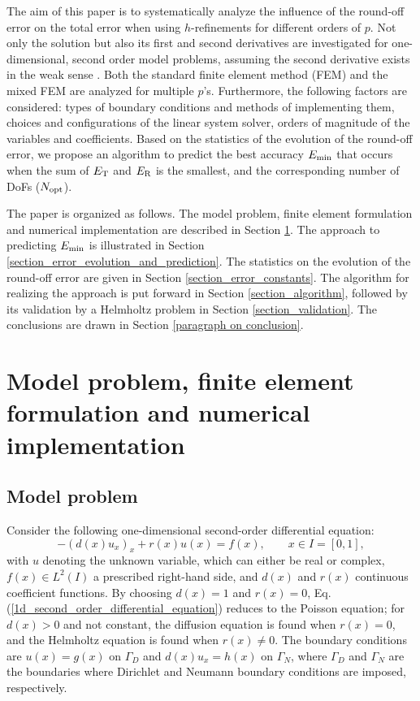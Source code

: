 \documentclass[review,3p]{elsarticle}
\begin{document}
The aim of this paper is to systematically analyze the influence of the round-off error on the total error when using $h$-refinements for different orders of $p$. Not only the solution but also its first and second derivatives are investigated for one-dimensional, second order model problems, assuming the second derivative exists in the weak sense \cite{necas2011direct}. Both the standard finite element method (FEM) and the mixed FEM \cite{boffi2013mixed} are analyzed for multiple $p$'s. Furthermore, the following factors are considered: types of boundary conditions and methods of implementing them, choices and configurations of the linear system solver, orders of magnitude of the variables and coefficients. Based on the statistics of the evolution of the round-off error, we propose an algorithm to predict the best accuracy $E_{\rm min}$ that occurs when the sum of $E_{\rm T}$ and $E_{\rm R}$ is the smallest, and the corresponding number of DoFs ($N_{\rm opt}$).

The paper is organized as follows. The model problem, finite element formulation and numerical implementation are described in Section \ref{section_model_problem_FEM_formulation_numerical_implementation}. The approach to predicting ${E}_{\rm {min}}$ is illustrated in Section \ref{section_error_evolution_and_prediction}. The statistics on the evolution of the round-off error are given in Section \ref{section_error_constants}. The algorithm for realizing the approach is put forward in Section \ref{section_algorithm}, followed by its validation by a Helmholtz problem in Section \ref{section_validation}. The conclusions are drawn in Section \ref{paragraph on conclusion}.


\section{Model problem, finite element formulation and numerical implementation}	\label{section_model_problem_FEM_formulation_numerical_implementation}

\subsection{Model problem}

Consider the following one-dimensional second-order differential equation:
\begin{equation}
  -\left(d(x) u_x \right)_x + r(x)u(x) = f(x),\qquad x \in I = [0,1],	\label{1d_second_order_differential_equation}
\end{equation}
with $u$ denoting the unknown variable, which can either be real or complex, $f(x) \in L^2 (I)$ a prescribed right-hand side, and $d(x)$ and $r(x)$ continuous coefficient functions.
By choosing $d(x)=1$ and $r(x)=0$, Eq. (\ref{1d_second_order_differential_equation}) reduces to the Poisson equation; for $d(x)>0$ and not constant, the diffusion equation is found when $r(x)=0$, and the Helmholtz equation \citep{haberman2012applied} is found when $r(x) \neq 0$. 
The boundary conditions are $u(x)=g(x)$ on $\Gamma_D$ and $d(x)u_x=h(x)$ on $\Gamma_N$, where $\Gamma_D$ and $\Gamma_N$ are the boundaries where Dirichlet and Neumann boundary conditions are imposed, respectively.
\end{document}
